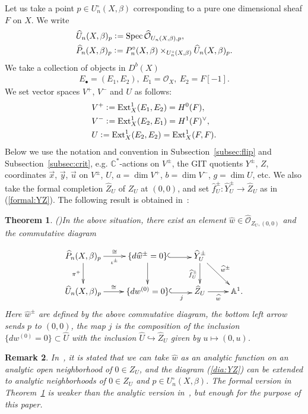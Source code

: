 \documentclass[11pt]{amsart}
\theoremstyle{plain}
\newtheorem{thm}{Theorem}[section]
\newtheorem{rmk}[thm]{Remark}
\newcommand{\oO}{\mathcal{O}}
\newcommand{\Ext}{\mathop{\rm Ext}\nolimits}
\newcommand{\Spec}{\mathop{\rm Spec}\nolimits}
\begin{document}
Let us take a point $p \in U_n^{\circ}(X, \beta)$
corresponding to a pure one dimensional sheaf $F$
on $X$. We write
\begin{align*}
&\widehat{U}_n(X, \beta)_p \cneq 
\Spec 
\widehat{\oO}_{U_n(X, \beta), p}, \\
&\widehat{P}_n(X, \beta)_p \cneq 
P_n^{\circ}(X, \beta) \times_{U_n^{\circ}(X, \beta)}
\widehat{U}_n(X, \beta)_p. 
\end{align*}
 We take a collection of objects in
$D^b(X)$
\begin{align}\label{E12}
E_{\bullet}=(E_1, E_2), 
\ E_1=\oO_X, \ 
E_2=F[-1].
\end{align}
We set vector spaces $V^+$, $V^-$ and $U$ as follows:
\begin{align}
&\label{V:Ext}V^+ \cneq \Ext^1_X(E_1, E_2)=H^0(F), \\ 
&\notag V^- \cneq \Ext^1_X(E_2, E_1)=H^1(F)^{\vee}, \\
&\notag U \cneq \Ext^1_X(E_2, E_2)=\Ext_X^1(F, F). 
\end{align}
Below we use the notation and 
convention in Subsection~\ref{subsec:flip}
and Subsection~\ref{subsec:crit}, e.g. 
$\mathbb{C}^{\ast}$-actions on $V^{\pm}$, 
the GIT quotients $Y^{\pm}$, $Z$, 
coordinates $\vec{x}$, $\vec{y}$, $\vec{u}$
on $V^{\pm}$, $U$, 
$a=\dim V^+$, $b=\dim V^-$, $g=\dim U$, 
etc. 
We also take the formal completion
$\widehat{Z}_U$ of $Z_U$ at $(0, 0)$, 
and set $\widehat{f}_U^{\pm} \colon \widehat{Y}_U^{\pm} \to \widehat{Z}_U$
as in (\ref{formal:YZ}). 
The following result is obtained in~\cite{Toddbir}: 
\begin{thm}\emph{(\cite[Theorem~6.18]{Toddbir})}\label{thm:Pflip}
In the above situation, 
there exist an element
$\widehat{w} \in \widehat{\oO}_{Z_U, (0, 0)}$ 
and the
commutative diagram

\begin{align}\label{dia:YZ}
\xymatrix{
\widehat{P}_n(X, \beta)_p \ar[r]^-{\cong}_-{\iota^{\pm}} \ar[d]_-{\pi^+}
& \{d\widehat{w}^{\pm}=0\} \ar@<-0.3ex>@{^{(}->}[r] \ar[d]
& \widehat{Y}_U^{\pm} 
\ar[d]_{\widehat{f}_U^{\pm}} \ar[rd]^-{\widehat{w}^{\pm}} &\\
\widehat{U}_n(X, \beta)_p \ar[r]^-{\cong} &
\{dw^{(0)}=0\} \ar@<-0.3ex>@{^{(}->}[r]_-{j}
& \widehat{Z}_U \ar[r]_-{\widehat{w}}  & \mathbb{A}^1.
}
\end{align}
Here $\widehat{w}^{\pm}$
are defined by the above commutative diagram, 
the bottom left arrow 
sends $p$ to $(0, 0)$, 
the map $j$
is 
the composition of the inclusion 
$\{dw^{(0)}=0\} \subset \widehat{U}$ with 
the inclusion 
$\widehat{U} \hookrightarrow \widehat{Z}_U$
given by 
$u\mapsto (0, u)$. 
\end{thm}
\begin{rmk}
In~\cite[Theorem~6.18]{Todbir}, 
it is stated that we can take $\widehat{w}$ as an 
analytic function on an analytic open neighborhood 
of $0 \in Z_U$, 
and the diagram (\ref{dia:YZ})
can be extended to analytic 
neighborhoods of $0 \in Z_U$ and 
$p \in U_n^{\circ}(X, \beta)$. 
The 
formal version in Theorem~\ref{thm:Pflip} 
is weaker than the analytic version in~\cite[Theorem~6.18]{Todbir}, 
but enough for the purpose of this paper.  
\end{rmk}
\end{document}
